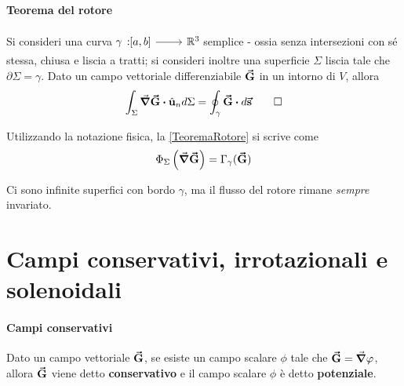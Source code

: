 \paragraph{Teorema del rotore}
\begin{theoremaqed}
	Si consideri una curva $\funz[\gamma]{\left[a,b\right]}{\realset^3}$ semplice - ossia senza intersezioni con sé stessa, chiusa e liscia a tratti; si consideri inoltre una superficie $\Sigma$ liscia tale che $\partial \Sigma=\gamma$. Dato un campo vettoriale differenziabile $\vb*{\va{G}}$ in un intorno di $V$, allora
	\begin{equation}
		\int_\Sigma\grad{\vba{G}}\vdot\vbh{u}_nd\Sigma=\oint_{\gamma}\vba{G}\vdot d\vba{s}\label{TeoremaRotore}\qedhere
	\end{equation}
\end{theoremaqed}
Utilizzando la notazione fisica, la \ref{TeoremaRotore} si scrive come
\begin{equation}
	\Phi_\Sigma\left(\grad{\vb*{\va{G}}}\right)=\Gamma_\gamma(\vb*{\va{G}})
\end{equation}
\begin{observe}
	Ci sono infinite superfici con bordo $\gamma$, ma il flusso del rotore rimane \textit{sempre} invariato.
\end{observe}
\section{Campi conservativi, irrotazionali e solenoidali}
\paragraph{Campi conservativi}
\begin{define}
	Dato un campo vettoriale $\vb*{\va{G}}$, se esiste un campo scalare $\phi$ tale che $\vb*{\va{G}}=\grad{\varphi}$, allora $\vb*{\va{G}}$ viene detto \textbf{conservativo} e il campo scalare $\phi$ è detto \textbf{potenziale}.
\end{define}
